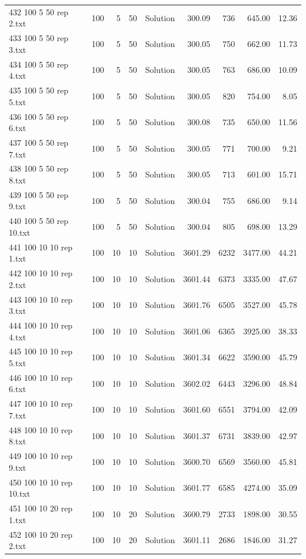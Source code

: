 \begin{longtable}{lrrllrrrr}
432 100 5 50 rep 2.txt & 100 & 5 & 50 & Solution & 300.09 & 736 & 645.00 & 12.36\\
433 100 5 50 rep 3.txt & 100 & 5 & 50 & Solution & 300.05 & 750 & 662.00 & 11.73\\
434 100 5 50 rep 4.txt & 100 & 5 & 50 & Solution & 300.05 & 763 & 686.00 & 10.09\\
435 100 5 50 rep 5.txt & 100 & 5 & 50 & Solution & 300.05 & 820 & 754.00 &  8.05\\
436 100 5 50 rep 6.txt & 100 & 5 & 50 & Solution & 300.08 & 735 & 650.00 & 11.56\\
437 100 5 50 rep 7.txt & 100 & 5 & 50 & Solution & 300.05 & 771 & 700.00 &  9.21\\
438 100 5 50 rep 8.txt & 100 & 5 & 50 & Solution & 300.05 & 713 & 601.00 & 15.71\\
439 100 5 50 rep 9.txt & 100 & 5 & 50 & Solution & 300.04 & 755 & 686.00 &  9.14\\
440 100 5 50 rep 10.txt & 100 & 5 & 50 & Solution & 300.04 & 805 & 698.00 & 13.29\\
441 100 10 10 rep 1.txt & 100 & 10 & 10 & Solution & 3601.29 & 6232 & 3477.00 & 44.21\\
442 100 10 10 rep 2.txt & 100 & 10 & 10 & Solution & 3601.44 & 6373 & 3335.00 & 47.67\\
443 100 10 10 rep 3.txt & 100 & 10 & 10 & Solution & 3601.76 & 6505 & 3527.00 & 45.78\\
444 100 10 10 rep 4.txt & 100 & 10 & 10 & Solution & 3601.06 & 6365 & 3925.00 & 38.33\\
445 100 10 10 rep 5.txt & 100 & 10 & 10 & Solution & 3601.34 & 6622 & 3590.00 & 45.79\\
446 100 10 10 rep 6.txt & 100 & 10 & 10 & Solution & 3602.02 & 6443 & 3296.00 & 48.84\\
447 100 10 10 rep 7.txt & 100 & 10 & 10 & Solution & 3601.60 & 6551 & 3794.00 & 42.09\\
448 100 10 10 rep 8.txt & 100 & 10 & 10 & Solution & 3601.37 & 6731 & 3839.00 & 42.97\\
449 100 10 10 rep 9.txt & 100 & 10 & 10 & Solution & 3600.70 & 6569 & 3560.00 & 45.81\\
450 100 10 10 rep 10.txt & 100 & 10 & 10 & Solution & 3601.77 & 6585 & 4274.00 & 35.09\\
451 100 10 20 rep 1.txt & 100 & 10 & 20 & Solution & 3600.79 & 2733 & 1898.00 & 30.55\\
452 100 10 20 rep 2.txt & 100 & 10 & 20 & Solution & 3601.11 & 2686 & 1846.00 & 31.27\\

\end{longtable}
